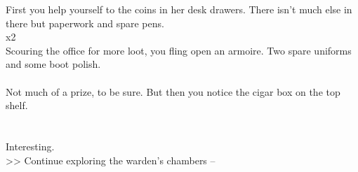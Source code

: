 First you help yourself to the coins in her desk drawers. There isn’t much else in there but paperwork and spare pens.\\
 x2\\

Scouring the office for more loot, you fling open an armoire. Two spare uniforms and some boot polish.\\
\\

Not much of a prize, to be sure. But then you notice the cigar box on the top shelf.\\
\\
\\

Interesting.\\

>> Continue exploring the warden’s chambers -- 